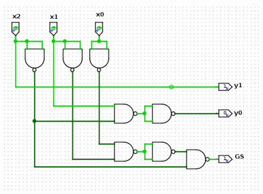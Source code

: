 \documentclass[a4paper, 11pt]{article}
\begin{document}
\includegraphics[scale = 0.75]{images/nand.png}
\end{document}
